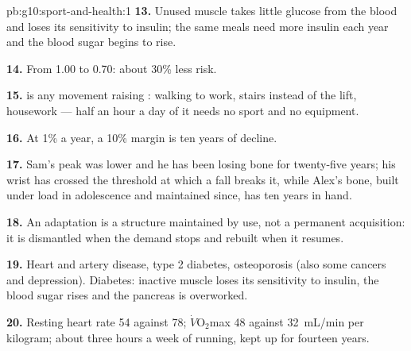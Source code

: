 \begin{solution}{pb:g10:sport-and-health:1}
\textbf{13.} Unused muscle takes little glucose from the blood and
loses its sensitivity to insulin; the same meals need more insulin
each year and the blood sugar begins to rise.

\textbf{14.} From 1.00 to 0.70: about 30\% less risk.

\textbf{15.}  is any movement raising : walking to work, stairs instead of the lift, housework
--- half an hour a day of it needs no sport and no equipment.

\textbf{16.} At 1\% a year, a 10\% margin is ten years of decline.

\textbf{17.} Sam's peak was lower and he has been losing bone for
twenty-five years; his wrist has crossed the threshold at which a fall
breaks it, while Alex's bone, built under load in adolescence and
maintained since, has ten years in hand.

\textbf{18.} An adaptation is a structure maintained by use, not a
permanent acquisition: it is dismantled when the demand stops and
rebuilt when it resumes.

\textbf{19.} Heart and artery disease, type 2 diabetes, osteoporosis
(also some cancers and depression). Diabetes: inactive muscle loses
its sensitivity to insulin, the blood sugar rises and the pancreas is
overworked.

\textbf{20.} Resting heart rate 54 against 78; $\dot V\!\mathrm{O_2}$max
\num{48} against \qty{32}{mL/min} per kilogram; about three hours a
week of running, kept up for fourteen years.
\end{solution}
